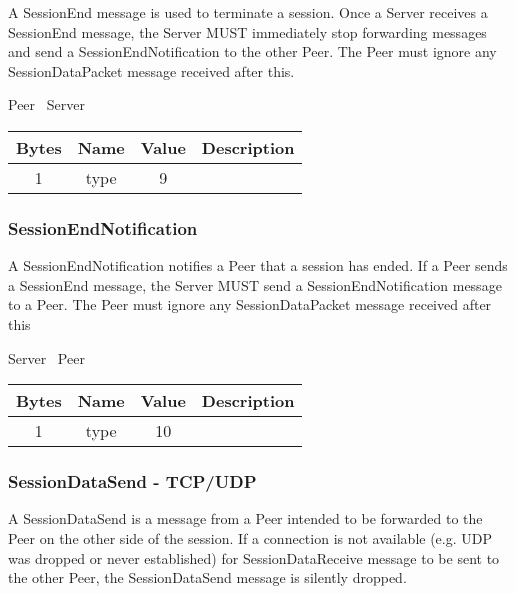 A SessionEnd message is used to terminate a session. Once a Server receives a SessionEnd message, the Server
MUST immediately stop forwarding messages and send a SessionEndNotification to the other Peer. The Peer must ignore
any SessionDataPacket message received after this.

\begin{center}
    Peer \textrightarrow\ Server\\
    \begin{tabular}{|c|c|c|c|}
        \hline
        \textbf{Bytes} & \textbf{Name} & \textbf{Value} & \textbf{Description} \\
        \hline
        1              & type          & 9              &                      \\
        \hline
    \end{tabular}
\end{center}

\subsubsection{SessionEndNotification}

A SessionEndNotification notifies a Peer that a session has ended. If a Peer sends a SessionEnd
message, the Server MUST send a SessionEndNotification message to a Peer. The Peer must ignore
any SessionDataPacket message received after this

\begin{center}
    Server \textrightarrow\ Peer\\
    \begin{tabular}{|c|c|c|c|}
        \hline
        \textbf{Bytes} & \textbf{Name} & \textbf{Value} & \textbf{Description} \\
        \hline
        1              & type          & 10              &                      \\
        \hline
    \end{tabular}
\end{center}

\subsubsection{SessionDataSend - TCP/UDP}

A SessionDataSend is a message from a Peer intended to be forwarded to the Peer on the other side of the
session. If a connection is not available (e.g. UDP was dropped or never established) for
SessionDataReceive message to be sent to the other Peer, the SessionDataSend message is silently dropped.

